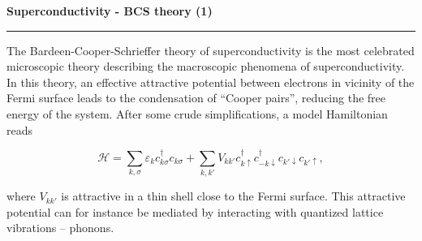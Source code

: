 
\begin{frame}
	\begin{block}{\color{white}\textbf{\Large{
					Superconductivity - BCS theory (1)
		}}}
		\vspace{-10pt}\rule{\textwidth}{0.5pt}
		\color{white}
		
	The Bardeen-Cooper-Schrieffer theory of superconductivity is the most celebrated microscopic theory describing the macroscopic phenomena of superconductivity. In this theory, an effective attractive potential between electrons in vicinity of the Fermi surface leads to the condensation of ``Cooper pairs'', reducing the free energy of the system. After some crude simplifications, a model Hamiltonian reads
		
	\end{block}
	{\large
		
		\begin{equation*} 
			\mathcal{H} = \sum_{k, \sigma}\varepsilon_kc_{k\sigma}^{\dagger}c_{k\sigma}  + \sum_{k, k'}V_{kk'}c_{k \uparrow}^{\dagger}c_{-k \downarrow}^{\dagger}c_{k'\downarrow}c_{k'\uparrow},
		\end{equation*}
	}
	
	\begin{block}{}
		\color{white}
		where $V_{kk'}$ is attractive in a thin shell close to the Fermi surface. This attractive potential can for instance be mediated by interacting with quantized lattice vibrations -- phonons. 
		
		
	\end{block}
	
	
\end{frame}




